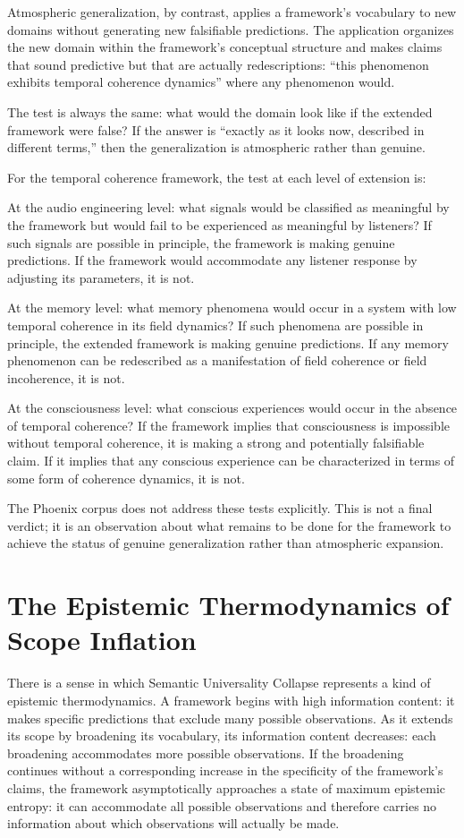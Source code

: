 Atmospheric generalization, by contrast, applies a
framework's vocabulary to new domains without generating
new falsifiable predictions. The application organizes
the new domain within the framework's conceptual structure
and makes claims that sound predictive but that are
actually redescriptions: ``this phenomenon exhibits
temporal coherence dynamics'' where any phenomenon would.

The test is always the same: what would the domain
look like if the extended framework were false? If the
answer is ``exactly as it looks now, described in different
terms,'' then the generalization is atmospheric rather
than genuine.

For the temporal coherence framework, the test at each
level of extension is:

At the audio engineering level: what signals would be
classified as meaningful by the framework but would fail
to be experienced as meaningful by listeners? If such
signals are possible in principle, the framework is making
genuine predictions. If the framework would accommodate
any listener response by adjusting its parameters, it
is not.

At the memory level: what memory phenomena would occur
in a system with low temporal coherence in its field
dynamics? If such phenomena are possible in principle,
the extended framework is making genuine predictions.
If any memory phenomenon can be redescribed as a
manifestation of field coherence or field incoherence,
it is not.

At the consciousness level: what conscious experiences
would occur in the absence of temporal coherence? If
the framework implies that consciousness is impossible
without temporal coherence, it is making a strong and
potentially falsifiable claim. If it implies that any
conscious experience can be characterized in terms of
some form of coherence dynamics, it is not.

The Phoenix corpus does not address these tests explicitly.
This is not a final verdict; it is an observation about
what remains to be done for the framework to achieve the
status of genuine generalization rather than atmospheric
expansion.

\section{The Epistemic Thermodynamics of Scope Inflation}
\label{sec:epistemic-thermodynamics}

There is a sense in which Semantic Universality Collapse
represents a kind of epistemic thermodynamics. A framework
begins with high information content: it makes specific
predictions that exclude many possible observations.
As it extends its scope by broadening its vocabulary,
its information content decreases: each broadening
accommodates more possible observations. If the broadening
continues without a corresponding increase in the
specificity of the framework's claims, the framework
asymptotically approaches a state of maximum epistemic
entropy: it can accommodate all possible observations
and therefore carries no information about which
observations will actually be made.

